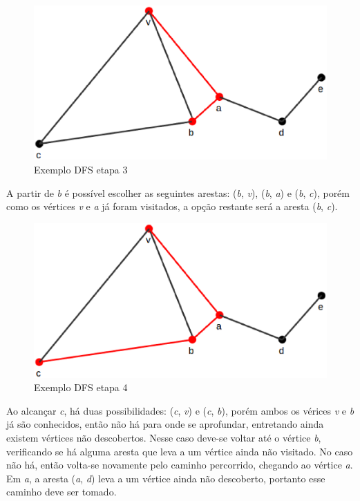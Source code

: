 \begin{figure}[!h]
	\centering
	\includegraphics[scale=0.4]{figuras/capitulo1/dfs/dfs3.eps}
	\caption{Exemplo DFS etapa 3}
	\label{dfs3}
\end{figure}

A partir de \textit{b} é possível escolher as seguintes arestas: (\textit{b}, \textit{v}), (\textit{b}, \textit{a}) e (\textit{b}, \textit{c}), porém como os vértices \textit{v} e \textit{a} já foram visitados, a opção restante será a aresta (\textit{b}, \textit{c}).

\begin{figure}[!h]
	\centering
	\includegraphics[scale=0.4]{figuras/capitulo1/dfs/dfs4.eps}
	\caption{Exemplo DFS etapa 4}
	\label{dfs4}
\end{figure}

Ao alcançar \textit{c}, há duas possibilidades: (\textit{c}, \textit{v}) e (\textit{c}, \textit{b}), porém ambos os vérices \textit{v} e \textit{b} já são conhecidos, então não há para onde se aprofundar, entretando ainda existem vértices não descobertos. Nesse caso deve-se voltar até o vértice \textit{b}, verificando se há alguma aresta que leva a um vértice ainda não visitado. No caso não há, então volta-se novamente pelo caminho percorrido, chegando ao vértice \textit{a}. Em \textit{a}, a aresta (\textit{a}, \textit{d}) leva a um vértice ainda não descoberto, portanto esse caminho deve ser tomado.

